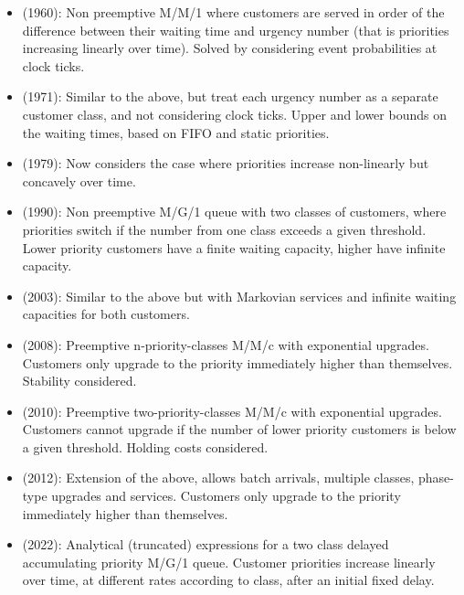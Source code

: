 \documentclass{article}
\begin{document}
\begin{itemize}
  \item \cite{jackson60} (1960): Non preemptive M/M/1 where customers
      are served in order of the difference between their waiting time
        and urgency number (that is priorities increasing linearly over
        time). Solved by considering event probabilities at clock ticks.
  \item \cite{holtzman71} (1971): Similar to the above, but treat each
      urgency number as a separate customer class, and not considering
        clock ticks. Upper and lower bounds on the waiting times, based
        on FIFO and static priorities.
  \item \cite{netterman79} (1979): Now considers the case where
      priorities increase non-linearly but concavely over time.
  \item \cite{fratini90} (1990): Non preemptive M/G/1 queue with two
      classes of customers, where priorities switch if the number from
        one class exceeds a given threshold. Lower priority customers
        have a finite waiting capacity, higher have infinite capacity.
  \item \cite{knessl03} (2003): Similar to the above but with Markovian
      services and infinite waiting capacities for both customers.
  \item \cite{xie08} (2008): Preemptive n-priority-classes M/M/c with
      exponential upgrades. Customers only upgrade to the priority
        immediately higher than themselves. Stability considered.
  \item \cite{down10} (2010): Preemptive two-priority-classes M/M/c with
      exponential upgrades. Customers cannot upgrade if the number of
        lower priority customers is below a given threshold. Holding
        costs considered.
  \item \cite{he12} (2012): Extension of the above, allows batch
      arrivals, multiple classes, phase-type upgrades and services.
        Customers only upgrade to the priority immediately higher than
        themselves.
  \item \cite{bilodeau22} (2022): Analytical (truncated) expressions for
      a two class delayed accumulating priority M/G/1 queue. Customer
        priorities increase linearly over time, at different rates
        according to class, after an initial fixed delay.
\end{itemize}

\end{document}
